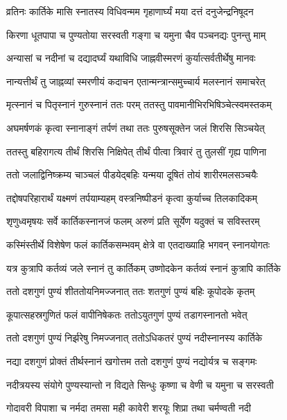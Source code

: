 \twolineshloka
{व्रतिनः कार्तिके मासि स्नातस्य विधिवन्मम}
{गृहाणार्घ्यं मया दत्तं दनुजेन्द्रनिषूदन} %

\twolineshloka
{किरणा धूतपापा च पुण्यतोया सरस्वती}
{गङ्गा च यमुना चैव पञ्चनद्यः पुनन्तु माम्} %

\twolineshloka
{अन्यासां च नदीनां च दद्यादर्घ्यं यथाविधि}
{जाह्नवीस्मरणं कुर्यात्सर्वतीर्थेषु मानवः} %

\twolineshloka
{नान्यत्तीर्थं तु जाह्नव्यां स्मरणीयं कदाचन}
{एतान्मन्त्रान्समुच्चार्य मलस्नानं समाचरेत्} %

\twolineshloka
{मृत्स्नानं च पितृस्नानं गुरुस्नानं ततः परम्}
{ततस्तु पावमानीभिरभिषिञ्चेत्स्वमस्तकम्} %

\twolineshloka
{अघमर्षणकं कृत्वा स्नानाङ्गं तर्पणं तथा}
{ततः पुरुषसूक्तेन जलं शिरसि सिञ्चयेत्} %

\twolineshloka
{ततस्तु बहिरागत्य तीर्थं शिरसि निक्षिपेत्}
{तीर्थं पीत्वा त्रिवारं तु तुलसीं गृह्य पाणिना} %

\twolineshloka
{ततो जलाद्विनिष्क्रम्य चाञ्चलं पीडयेद्बहिः}
{यन्मया दूषितं तोयं शारीरमलसञ्चयैः} %

\twolineshloka
{तद्दोषपरिहारार्थं यक्ष्मणं तर्पयाम्यहम्}
{वस्त्रनिष्पीडनं कृत्वा कुर्याच्च तिलकादिकम्} %


\twolineshloka
{शृणुध्वमृषयः सर्वे कार्तिकस्नानजं फलम्}
{अरुणं प्रति सूर्येण यदुक्तं च सविस्तरम्} %


\twolineshloka
{कस्मिंस्तीर्थे विशेषेण फलं कार्तिकसम्भवम्}
{क्षेत्रे वा एतदाख्याहि भगवन् स्नानयोगतः} %


\twolineshloka
{यत्र कुत्रापि कर्तव्यं जले स्नानं तु कार्तिकम्}
{उष्णोदकेन कर्तव्यं स्नानं कुत्रापि कार्तिके} %

\twolineshloka
{ततो दशगुणं पुण्यं शीततोयनिमज्जनात्}
{ततः शतगुणं पुण्यं बहिः कूपोदके कृतम्} %

\twolineshloka
{कूपात्सहस्रगुणितं फलं वापीनिषेकतः}
{ततोऽयुतगुणं पुण्यं तडागस्नानतो भवेत्} %

\twolineshloka
{ततो दशगुणं पुण्यं निर्झरेषु निमज्जनात्}
{ततोऽधिकतरं पुण्यं नदीस्नानस्य कार्तिके} %

\twolineshloka
{नद्या दशगुणं प्रोक्तं तीर्थस्नानं खगोत्तम}
{ततो दशगुणं पुण्यं नद्योर्यत्र च सङ्गमः} %

\twolineshloka
{नदीत्रयस्य संयोगे पुण्यस्यान्तो न विद्यते}
{सिन्धुः कृष्णा च वेणी च यमुना च सरस्वती} %

\twolineshloka
{गोदावरी विपाशा च नर्मदा तमसा मही}
{कावेरी शरयूः शिप्रा तथा चर्मण्वती नदी} %

